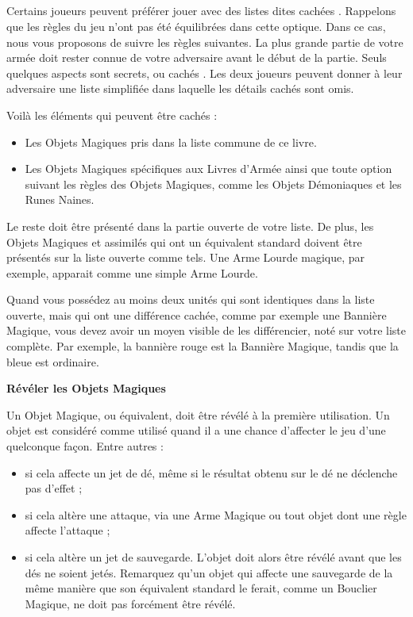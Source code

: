 \subsection[Règles optionnelles pour listes cachées]{}
\label{hidden_lists}

Certains joueurs peuvent préférer jouer avec des listes dites \og cachées \fg{}. Rappelons que les règles du jeu n'ont pas été équilibrées dans cette optique. Dans ce cas, nous vous proposons de suivre les règles suivantes. La plus grande partie de votre armée doit rester connue de votre adversaire avant le début de la partie. Seuls quelques aspects sont secrets, ou \og cachés \fg{}. Les deux joueurs peuvent donner à leur adversaire une liste simplifiée dans laquelle les détails cachés sont omis.

Voilà les éléments qui peuvent être cachés : 

\begin{itemize}[label={-}]
\item Les Objets Magiques pris dans la liste commune de ce livre.
\item Les Objets Magiques spécifiques aux Livres d'Armée ainsi que toute option suivant les règles des Objets Magiques, comme les Objets Démoniaques et les Runes Naines.
\end{itemize}

Le reste doit être présenté dans la partie ouverte de votre liste. De plus, les Objets Magiques et assimilés qui ont un équivalent standard doivent être présentés sur la liste ouverte comme tels. Une Arme Lourde magique, par exemple, apparait comme une simple Arme Lourde.

Quand vous possédez au moins deux unités qui sont identiques dans la liste ouverte, mais qui ont une différence cachée, comme par exemple une Bannière Magique, vous devez avoir un moyen visible de les différencier, noté sur votre liste complète. Par exemple, la bannière rouge est la Bannière Magique, tandis que la bleue est ordinaire.

\noindent\textbf{Révéler les Objets Magiques}

Un Objet Magique, ou équivalent, doit être révélé à la première utilisation. Un objet est considéré comme utilisé quand il a une chance d'affecter le jeu d'une quelconque façon. Entre autres :
\begin{itemize}[label={-}]
\item si cela affecte un jet de dé, même si le résultat obtenu sur le dé ne déclenche pas d'effet ;
\item si cela altère une attaque, via une Arme Magique ou tout objet dont une règle affecte l'attaque ;
\item si cela altère un jet de sauvegarde. L'objet doit alors être révélé avant que les dés ne soient jetés. Remarquez qu'un objet qui affecte une sauvegarde de la même manière que son équivalent standard le ferait, comme un Bouclier Magique, ne doit pas forcément être révélé.
\end{itemize}

